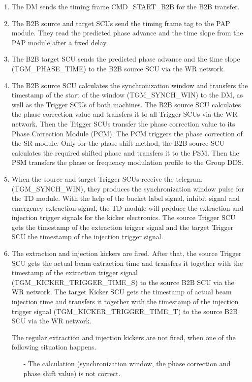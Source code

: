 \begin{enumerate}
\item The DM sends the timing frame CMD\_START\_B2B for the B2B transfer. 

\item  The B2B source and target SCUs send the timing frame tag to the PAP module. They read the predicted phase advance and the time slope from the PAP module after a fixed delay. 

\item  The B2B target SCU sends the predicted phase advance and the time slope (TGM\_PHASE\_TIME) to the B2B source SCU via the WR network. 

\item  The B2B source SCU calculates the synchronization window and transfers the timestamp of the start of the window (TGM\_SYNCH\_WIN) to the DM, as well as the Trigger SCUs of both machines.
The B2B source SCU calculates the phase correction value and transfers it to all Trigger SCUs via the WR network. Then the Trigger SCUs transfer the phase correction value to its Phase Correction Module (\gls{PCM}). The PCM triggers the phase correction of the SR module. 
Only for the phase shift method, the B2B source SCU calculates the required shifted phase and transfers it to the PSM. Then the PSM transfers the phase or frequency modulation profile to the Group DDS.  

\item  When the source and target Trigger SCUs receive the telegram (TGM\_SYNCH\_WIN), they produces the synchronization window pulse for the TD module. With the help of the bucket label signal, inhibit signal and emergency extraction signal, the TD module will produce the extraction and injection trigger signals for the kicker electronics.  
The source Trigger SCU gets the timestamp of the extraction trigger signal and the target Trigger SCU the timestamp of the injection trigger signal.
\item  The extraction and injection kickers are fired. 
After that, the source Trigger SCU gets the actual beam extraction time and transfers it together with the timestamp of the extraction trigger signal (TGM\_KICKER\_TRIGGER\_TIME\_S) to the source B2B SCU via the WR network.
The target Kicker SCU gets the timestamp of actual beam injection time and transfers it together with the timestamp of the injection trigger signal (TGM\_KICKER\_TRIGGER\_TIME\_T) to the source B2B SCU via the WR network.

The regular extraction and injection kickers are not fired, when one of the following situation happens. 
\begin{itemize}
\item[-] The calculation (synchronization window, the phase correction and phase shift value) is not correct. 


\end{itemize}
\end{enumerate}
